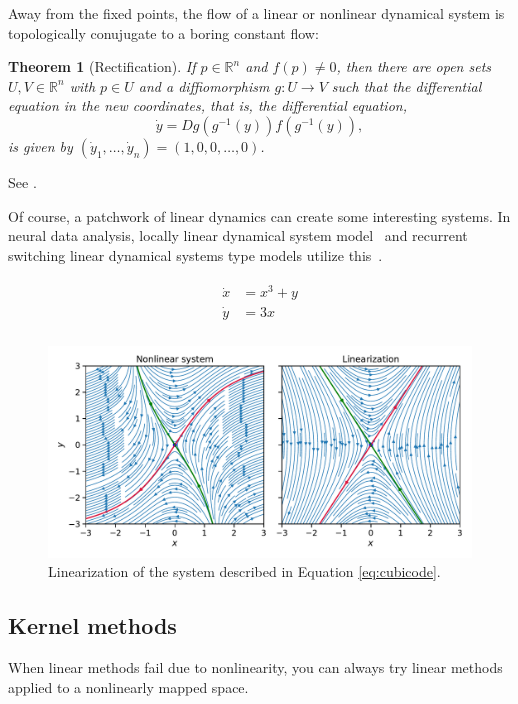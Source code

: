 \documentclass[a4paper,11pt]{exam}
\newtheorem{theorem}{Theorem}
\newcounter{ct}
\newcommand{\inv}{^{-1}}
\newcommand{\field}[1]{\ensuremath{\mathbb{#1}}}
\newcommand{\reals}{\field{R}}
\begin{document}
\begin{questions}
Away from the fixed points, the flow of a linear or nonlinear dynamical system is topologically conujugate to a boring constant flow:
\begin{theorem}[Rectification]
    If $p \in \reals^n$ and $f(p) \neq 0$, then there are open sets $U, V \in \reals^n$ with $p \in U$ and a diffiomorphism $g: U \to V$ such that the differential equation in the new coordinates, that is, the differential equation,
    $$ \dot{y} = Dg(g\inv(y)) f(g\inv(y)), $$
is given by $(\dot{y}_1, \ldots, \dot{y}_n) = (1, 0, 0, \ldots, 0)$.
\end{theorem}
See \citet[Lemma 1.120]{Chicone2006}.

Of course, a patchwork of linear dynamics can create some interesting systems.
In neural data analysis, locally linear dynamical system model~\cite{Zhao2016d} and recurrent switching linear dynamical systems type models utilize this~\citep{Linderman2017,Nassar2018b}.

\begin{align}\label{eq:cubicode}
\begin{split}
\dot x &= x^3 + y\\
\dot y &= 3x \\
\end{split}
\end{align}

\begin{figure}[h]
    \centering
    \includegraphics[width=\textwidth]{linearization}
    \caption{Linearization of the system described in Equation \ref{eq:cubicode}.}
    \label{fig:linearization}
\end{figure}

\subsection{Kernel methods}
When linear methods fail due to nonlinearity, you can always try linear methods applied to a nonlinearly mapped space.


\end{questions}
\end{document}
